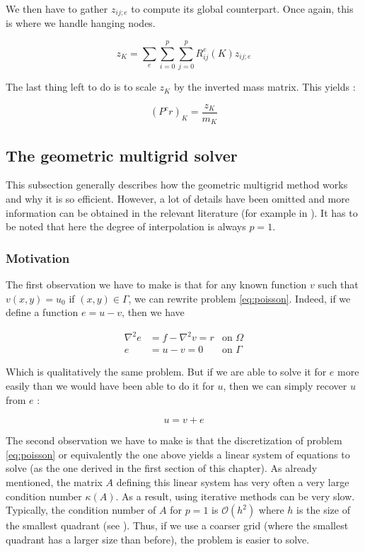 We then have to gather $z_{ij;e}$ to compute its global counterpart. Once again, this is where we handle hanging nodes.

$$z_{K} = \sum_e\sum_{i=0}^p\sum_{j=0}^p R^e_{ij}(K)z_{ij;e}$$

The last thing left to do is to scale $z_K$ by the inverted mass matrix. This yields : 

$$(P^cr)_K = \frac{z_K}{m_K}$$

\subsection{The geometric multigrid solver}

This subsection generally describes how the geometric multigrid method works and why it is so efficient. However, a lot of details have been omitted and more information can be obtained in the relevant literature (for example in \cite{multi_book}). It has to be noted that here the degree of interpolation is always $p=1$.

\subsubsection{Motivation}

The first observation we have to make is that for any known function $v$ such that $v(x,y)=u_0$ if $(x,y) \in \Gamma$, we can rewrite problem \ref{eq:poisson}. Indeed, if we define a function $e = u-v$, then we have

\begin{align}
\nabla ^2 e &= f-\nabla^2v = r &\text{on $\Omega$} \label{eq:poisson_error}\\
e &= u-v = 0 &\text{on $\Gamma$}
\end{align}

Which is qualitatively the same problem. But if we are able to solve it for $e$ more easily than we would have been able to do it for $u$, then we can simply recover $u$ from $e$ : 

$$u = v + e$$

The second observation we have to make is that the discretization of problem \ref{eq:poisson} or equivalently the one above yields a linear system of equations to solve (as the one derived in the first section of this chapter). As already mentioned, the matrix $A$ defining this linear system has very often a very large condition number $\kappa(A)$. As a result, using iterative methods can be very slow. Typically, the condition number of $A$ for $p=1$ is $\mathcal{O}(h^2)$ where $h$ is the size of the smallest quadrant (see \cite{condNumb}). Thus, if we use a coarser grid (where the smallest quadrant has a larger size than before), the problem is easier to solve. 

